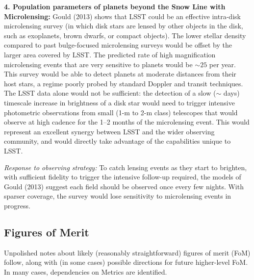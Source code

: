 {\bf 4. Population parameters of planets beyond the Snow Line with Microlensing:} Gould
(2013) shows that LSST could be an effective intra-disk microlensing
survey (in which disk stars are lensed by other objects in the disk,
such as exoplanets, brown dwarfs, or compact objects). The lower
stellar density compared to past bulge-focused microlensing surveys
would be offset by the larger area covered by LSST. The predicted rate
of high magnification microlensing events that are very sensitive to
planets would be $\sim 25$ per year. This survey would be able to
detect planets at moderate distances from their host stars, a regime
poorly probed by standard Doppler and transit techniques. The LSST
data alone would not be sufficient: the detection of a slow ($\sim$
days) timescale increase in brightness of a disk star would need to
trigger intensive photometric observations from small (1-m to 2-m
class) telescopes that would observe at high cadence for the 1--2
months of the microlensing event. This would represent an excellent
synergy between LSST and the wider observing community, and would
directly take advantage of the capabilities unique to LSST.

{\it Response to observing strategy:} To catch lensing events as they
start to brighten, with sufficient fidelity to trigger the intensive
follow-up required, the models of Gould (2013) suggest each field
should be observed once every few nights. With sparser coverage,
the survey would lose sensitivity to microlensing events in progress.


\subsection{Figures of Merit}
\label{sec:\secname:MW_Disk_metrics}


Unpolished notes about likely (reasonably straightforward) figures of
merit (FoM) follow, along with (in some cases) possible directions for
future higher-level FoM. In many cases, dependencies on
Metrics are identified.  


